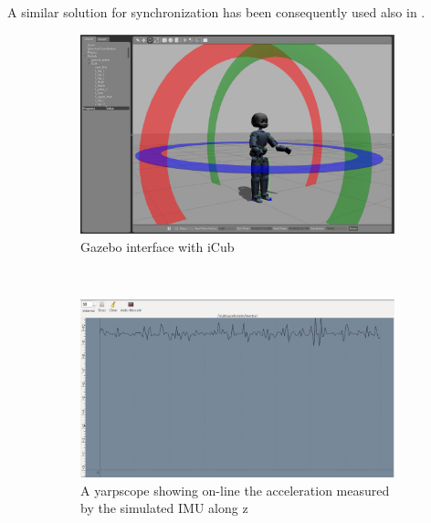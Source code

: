 A similar solution for synchronization has been consequently used also in \cite{wbi14}.

\begin{figure}
        \centering
        \begin{subfigure}[b]{0.475\textwidth}
                \includegraphics[width=\textwidth]{images/icub_imu_b.eps}
                \caption{Gazebo interface with iCub}
                \label{yarp_simulation_icub_a}
        \end{subfigure}%
        \\
        \begin{subfigure}[b]{0.475\textwidth}
                \includegraphics[width=\textwidth]{images/icub_imu_a.eps}
                \caption{A yarpscope showing on-line the acceleration measured by the simulated IMU along z}
                \label{yarp_simulation_icub_b}
        \end{subfigure}
        \\
        \begin{subfigure}[b]{0.475\textwidth}

\end{subfigure}
\end{figure}
